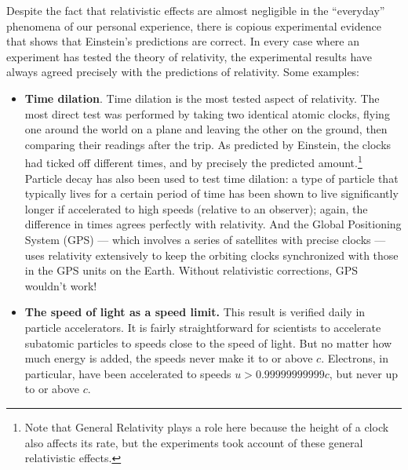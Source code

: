 Despite the fact that relativistic effects are almost negligible in
the ``everyday'' phenomena of our personal experience, there is 
copious experimental evidence
that shows that Einstein's predictions are correct.  In every case
where an experiment has tested the theory of relativity, the
experimental results have always agreed precisely with the predictions
of relativity.  Some examples:

\begin{itemize}
\item \textbf{Time dilation}.  Time dilation is the most tested aspect of
relativity.  The most direct test was performed by taking two
identical atomic clocks, flying one around the world on a plane and
leaving the other on the ground, then comparing their readings after
the trip.  As predicted by Einstein, the clocks had ticked off
different times, and by precisely the predicted amount.\footnote{Note
that General Relativity plays a role here because the height of a
clock also affects its rate, but the experiments took account of these
general relativistic effects.} Particle decay has also been used to
test time dilation: a type of particle that typically lives for a
certain period of time has been shown to live significantly longer if
accelerated to high speeds (relative to an observer); again, the
difference in times agrees perfectly with relativity.  And the Global
Positioning System (GPS) --- which involves a series of satellites
with precise clocks --- uses relativity extensively to keep the
orbiting clocks synchronized with those in the GPS units on the Earth.
Without relativistic corrections, GPS wouldn't work!
   
\item \textbf{The speed of light as a speed limit.}  This result is verified
daily in particle accelerators.  It is fairly straightforward for
scientists to accelerate subatomic particles to speeds close to the
speed of light.  But no matter how much energy is added, the speeds
never make it to or above $c$.  Electrons, in particular, have been
accelerated to speeds $u> 0.99999999999c$, but never up to or above $c$.
   

\end{itemize}

